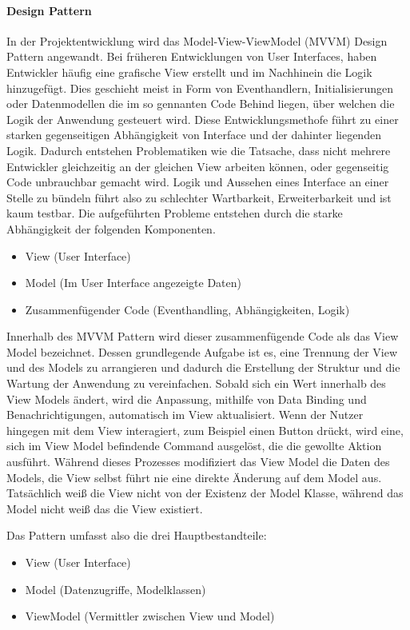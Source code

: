 \paragraph{Design Pattern}
In der Projektentwicklung wird das Model-View-ViewModel (MVVM) Design Pattern angewandt.
Bei früheren Entwicklungen von User Interfaces, haben Entwickler häufig eine grafische View erstellt und im Nachhinein die Logik hinzugefügt.
Dies geschieht meist in Form von Eventhandlern, Initialisierungen oder Datenmodellen die im so gennanten Code Behind liegen, über welchen die Logik der Anwendung gesteuert wird.
Diese Entwicklungsmethofe führt zu einer starken gegenseitigen Abhängigkeit von Interface und der dahinter liegenden Logik.
Dadurch entstehen Problematiken wie die Tatsache, dass nicht mehrere Entwickler gleichzeitig an der gleichen View arbeiten können, oder gegenseitig Code unbrauchbar gemacht wird.
Logik und Aussehen eines Interface an einer Stelle zu bündeln führt also zu schlechter Wartbarkeit, Erweiterbarkeit und ist kaum testbar\cite{.g}.
Die aufgeführten Probleme entstehen durch die starke Abhängigkeit der folgenden Komponenten.

\begin{itemize}
 	\item View (User Interface)
 	\item Model (Im User Interface angezeigte Daten)
	\item Zusammenfügender Code (Eventhandling, Abhängigkeiten, Logik)
\end{itemize}

Innerhalb des MVVM Pattern wird dieser zusammenfügende Code als das View Model bezeichnet.
Dessen grundlegende Aufgabe ist es, eine Trennung der View und des Models zu arrangieren und dadurch die Erstellung der Struktur und die Wartung der Anwendung zu vereinfachen.
Sobald sich ein Wert innerhalb des View Models ändert, wird die Anpassung, mithilfe von Data Binding und Benachrichtigungen, automatisch im View aktualisiert.
Wenn der Nutzer hingegen mit dem View interagiert, zum Beispiel einen Button drückt, wird eine, sich im View Model befindende Command ausgelöst, die die gewollte Aktion ausführt.
Während dieses Prozesses modifiziert das View Model die Daten des Models, die View selbst führt nie eine direkte Änderung auf dem Model aus.
Tatsächlich weiß die View nicht von der Existenz der Model Klasse, während das Model nicht weiß das die View existiert.

Das Pattern umfasst also die drei Hauptbestandteile:
\begin{itemize}
 	\item View (User Interface)
 	\item Model (Datenzugriffe, Modelklassen)
	\item ViewModel (Vermittler zwischen View und Model)
\end{itemize}

